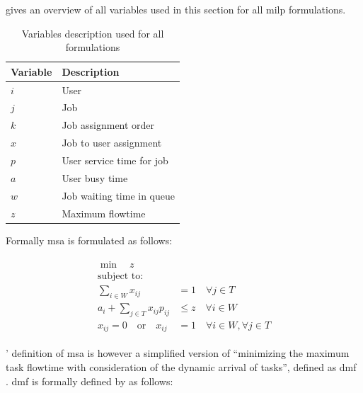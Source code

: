  gives an overview of all variables used in this section for all \gls{milp} formulations.

\begin{table}[!ht]
\centering
\begin{tabular}{@{}ll@{}}
\toprule
Variable & Description \\ \midrule
$i$         & User            \\
$j$         & Job            \\
$k$         & Job assignment order            \\
$x$         & Job to user assignment            \\
$p$         & User service time for job            \\
$a$         & User busy time            \\
$w$         & Job waiting time in queue            \\
$z$         & Maximum flowtime            \\ \bottomrule
\end{tabular}
\caption{Variables description used for all  formulations}
\label{tab:milp_variables}
\end{table}

Formally \gls{msa} is formulated as follows:

\begin{align}
	\begin{split}
	    \min \quad z\\
	    \text{subject to:} \\
	    \sum_{i \in W} x_{ij} &= 1 \quad \forall j \in T\\
	    a_i + \sum_{j \in T} x_{ij} p_{ij} &\leq z \quad \forall i \in W\\
	    x_{ij}=0 \quad \text{or} \quad x_{ij} &=1 \quad \forall i \in W, \forall j \in T
	\end{split}
\end{align}

\citet{Zeng2005}' definition of \gls{msa} is however a simplified version of ``minimizing the maximum task flowtime with consideration of the dynamic arrival of tasks'', defined as \gls{dmf} \citep{Baker1974,Zeng2005}. \gls{dmf} is formally defined by \citet{Zeng2005} as follows:

